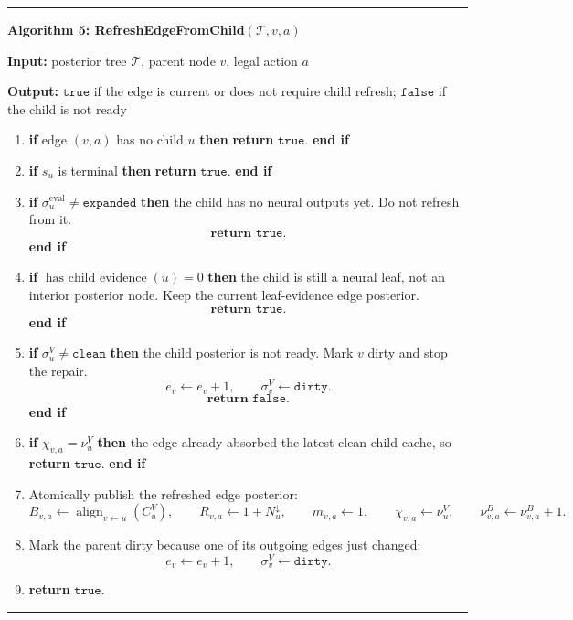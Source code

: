 \documentclass[11pt]{article}
\newcommand{\Tree}{\mathcal{T}}
\newcommand{\Align}{\operatorname{align}}
\newenvironment{algorithmblock}[1]
{
  \par\medskip
  \noindent\hrule\par\smallskip
  \noindent\textbf{#1}
  \par\smallskip
}
{
  \par\smallskip\noindent\hrule\par\medskip
}
\newcommand{\Input}{\textbf{Input: }}
\newcommand{\Output}{\textbf{Output: }}
\newcommand{\Return}{\textbf{return }}
\newcommand{\If}{\textbf{if }}
\newcommand{\Then}{\textbf{ then }}
\newcommand{\EndIf}{\textbf{end if}}
\begin{document}
\begin{algorithmblock}{Algorithm 5: RefreshEdgeFromChild\((\Tree,v,a)\)}

\Input posterior tree \(\Tree\), parent node \(v\), legal action \(a\)

\Output \(\texttt{true}\) if the edge is current or does not require child refresh; \(\texttt{false}\) if the child is not ready

\begin{enumerate}[leftmargin=2em]
  \item \If edge \((v,a)\) has no child \(u\) \Then \Return \(\texttt{true}\). \EndIf

  \item \If \(s_u\) is terminal \Then \Return \(\texttt{true}\). \EndIf

  \item \If \(\sigma^{\mathrm{eval}}_u\ne\texttt{expanded}\) \Then
  the child has no neural outputs yet. Do not refresh from it.
  \[
  \Return \texttt{true}.
  \]
  \EndIf

  \item \If \(\operatorname{has\_child\_evidence}(u)=0\) \Then
  the child is still a neural leaf, not an interior posterior node. Keep the
  current leaf-evidence edge posterior.
  \[
  \Return \texttt{true}.
  \]
  \EndIf

  \item \If \(\sigma^V_u\ne\texttt{clean}\) \Then
  the child posterior is not ready. Mark \(v\) dirty and stop the repair.
  \[
  e_v\gets e_v+1,
  \qquad
  \sigma^V_v\gets\texttt{dirty}.
  \]
  \[
  \Return \texttt{false}.
  \]
  \EndIf

  \item \If \(\chi_{v,a}=\nu^V_u\) \Then the edge already absorbed the latest
  clean child cache, so \Return \(\texttt{true}\). \EndIf

  \item Atomically publish the refreshed edge posterior:
  \[
  B_{v,a}
  \gets
  \Align_{v\leftarrow u}(C^V_u),
  \qquad
  R_{v,a}\gets 1+N^\downarrow_u,
  \qquad
  m_{v,a}\gets 1,
  \qquad
  \chi_{v,a}\gets \nu^V_u,
  \qquad
  \nu^B_{v,a}\gets\nu^B_{v,a}+1.
  \]

  \item Mark the parent dirty because one of its outgoing edges just changed:
  \[
  e_v\gets e_v+1,
  \qquad
  \sigma^V_v\gets\texttt{dirty}.
  \]

  \item \Return \(\texttt{true}\).
\end{enumerate}

\end{algorithmblock}
\end{document}
